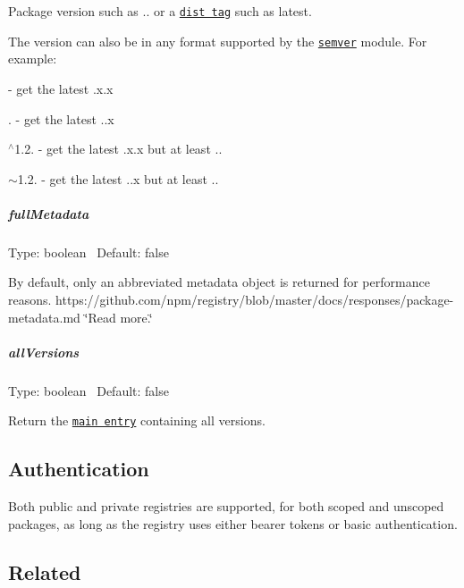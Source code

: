 Package version such as {..} or a \href{https://docs.npmjs.com/cli/dist-tag}{\tt dist tag} such as {\ttfamily latest}.

The version can also be in any format supported by the \href{https://github.com/npm/node-semver}{\tt semver} module. For example\+:


\begin{DoxyItemize}
\item {} -\/ get the latest {.\+x.\+x}
\item {.} -\/ get the latest {..\+x}
\item {\ttfamily $^\wedge$1.2.} -\/ get the latest {.\+x.\+x} but at least {..}
\item {\ttfamily $\sim$1.2.} -\/ get the latest {..\+x} but at least {..}
\end{DoxyItemize}

\subparagraph*{full\+Metadata}

Type\+: {\ttfamily boolean}~\newline
 Default\+: {\ttfamily false}

By default, only an abbreviated metadata object is returned for performance reasons. https\+://github.com/npm/registry/blob/master/docs/responses/package-\/metadata.\+md \char`\"{}\+Read more.\char`\"{}

\subparagraph*{all\+Versions}

Type\+: {\ttfamily boolean}~\newline
 Default\+: {\ttfamily false}

Return the \href{https://registry.npmjs.org/ava}{\tt main entry} containing all versions.

\subsection*{Authentication}

Both public and private registries are supported, for both scoped and unscoped packages, as long as the registry uses either bearer tokens or basic authentication.

\subsection*{Related}


